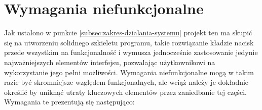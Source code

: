 \documentclass[a4paper,twoside,12pt]{book}
\begin{document}
\section{Wymagania niefunkcjonalne}
\label{sec:wymagania-niefunkcjonalne}

Jak ustalono w punkcie \ref{subsec:zakres-dzialania-systemu} projekt ten ma skupić się na utworzeniu solidnego szkieletu programu, takie rozwiązanie kładzie nacisk przede wszystkim na funkcjonalność i wymusza jednocześnie zastosowanie jedynie najważniejszych elementów interfejsu, pozwalając użytkownikowi na wykorzystanie jego pełni możliwości. Wymagania niefunkcjonalne mogą w takim razie być skromniejsze względem funkcjonalnych, ale wciąż należy je dokładnie określić by uniknąć utraty kluczowych elementów przez zaniedbanie tej części. Wymagania te prezentują się następująco:
\end{document}
